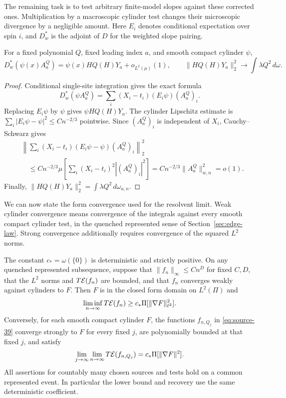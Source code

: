 The remaining task is to test arbitrary finite-model slopes against these
corrected ones. Multiplication by a macroscopic cylinder test changes
their microscopic divergence by a negligible amount. Here $E_i$ denotes
conditional expectation over spin $i$, and $D_w^*$ is the adjoint of $D$
for the weighted slope pairing.

\begin{lemma}
\label{lem:micro-divergence}
For a fixed polynomial $Q$, fixed leading index $a$, and smooth compact
cylinder $\psi$,
\[
 D_w^*(\psi(x)A_a^Q)
       =\psi(x)HQ(H)Y_a+o_{L^2(\mu)}(1),
 \qquad
 \|HQ(H)Y_a\|_2^2\longrightarrow\int\lambda Q^2\,d\omega.
\]
\end{lemma}

\begin{proof}
Conditional single-site integration gives the exact formula
\[
 D_w^*(\psi A_a^Q)
     =\sum_i(X_i-t_i)(E_i\psi)(A_a^Q)_i.
\]
Replacing $E_i\psi$ by $\psi$ gives $\psi HQ(H)Y_a$.
The cylinder Lipschitz estimate is
$\sum_i|E_i\psi-\psi|^2\le Cn^{-2/3}$ pointwise. Since $(A_a^Q)_i$ is
independent of $X_i$, Cauchy--Schwarz gives
\[
 \begin{split}
 &\left\|\sum_i(X_i-t_i)(E_i\psi-\psi)(A_a^Q)_i\right\|_2^2\\
 &\quad\le Cn^{-2/3}
       \mu\!\left[\sum_i(X_i-t_i)^2|(A_a^Q)_i|^2\right]
       =Cn^{-2/3}\|A_a^Q\|_{w,n}^2=o(1).
 \end{split}
\]
Finally,
$\|HQ(H)Y_a\|_2^2=\int\lambda Q^2\,d\omega_{a,n}$.
\end{proof}

We can now state the form convergence used for the resolvent limit.
Weak cylinder convergence means convergence of the integrals against every
smooth compact cylinder test, in the quenched represented sense of
Section~\ref{sec:edge-law}. Strong convergence additionally requires
convergence of the squared $L^2$ norms.

\begin{theorem}
\label{thm:micro-relaxation}
The constant $c_*=\omega(\{0\})$ is deterministic and strictly positive.
On any quenched represented subsequence, suppose that
$\|f_n\|_\infty\le Cn^D$ for fixed $C,D$, that the $L^2$ norms and
$T\mathcal E(f_n)$ are bounded, and that $f_n$ converges weakly against cylinders
to $F$. Then $F$ is in the closed form domain on $L^2(\Pi)$ and
\begin{equation}
 \liminf_{n\to\infty}T\mathcal E(f_n)
        \ge c_*\Pi[\|\nabla F\|_{\ell^2}^2].
 \label{eq:source-38}
\end{equation}
Conversely, for each smooth compact cylinder $F$, the functions
$f_{n,Q_j}$ in \eqref{eq:source-39} converge strongly to $F$ for every fixed
$j$, are polynomially bounded at that fixed $j$, and satisfy
\[
 \lim_{j\to\infty}\lim_{n\to\infty}T\mathcal E(f_{n,Q_j})
                       =c_*\Pi[\|\nabla F\|^2].
\]
All assertions for countably many chosen sources and tests hold on a
common represented event. In particular the lower bound and recovery
use the same deterministic coefficient.
\end{theorem}

